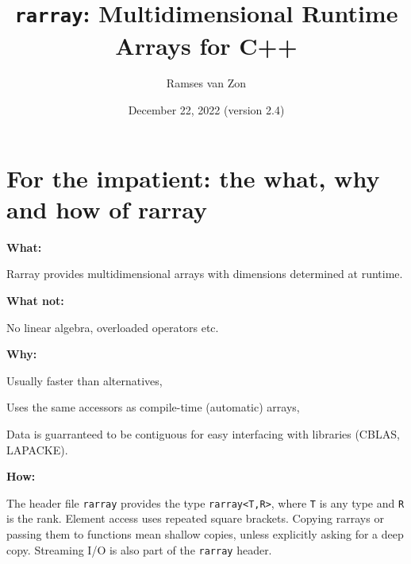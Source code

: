 \documentclass[11pt,twoside]{article}
\newcommand{\cxx}{C{++}}
\begin{document}
\setlength{\parskip}{1mm}

\title{\texttt{rarray}: Multidimensional Runtime Arrays for \cxx}

\author{Ramses van Zon%
\vspace{-8pt}} 

\date{December 22, 2022 (version 2.4)\vspace{-7mm}}

\maketitle

\section{For the impatient: the what, why and how of rarray}

\noindent\textbf{What:}

Rarray provides multidimensional arrays with dimensions determined at runtime. 

\noindent\textbf{What not:} 

No linear algebra, overloaded operators etc.

\noindent\textbf{Why:} 

Usually faster than alternatives,

Uses the same accessors as compile-time (automatic) arrays,

Data is guarranteed to be contiguous for easy interfacing with
libraries (CBLAS, LAPACKE).

\noindent\textbf{How:}

The header file \texttt{rarray} provides the type \texttt{rarray<T,R>}, where \texttt{T} is any type and {\tt R} is the rank. Element access uses repeated square brackets. Copying rarrays or passing them to functions mean shallow copies, unless explicitly asking for a deep copy. Streaming I/O is also part of the \texttt{rarray} header.

\
\end{document}
